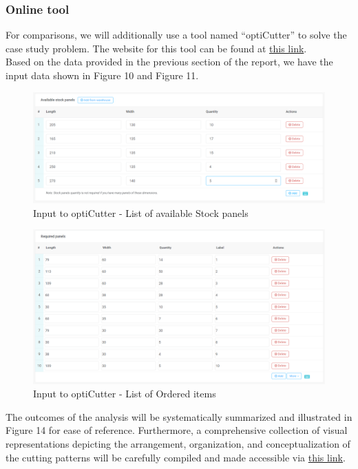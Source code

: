 \documentclass[a4paper]{article}
\begin{document}
    \subsubsection{Online tool}
    For comparisons, we will additionally use a tool named ``optiCutter'' to solve the case study problem. The website for this tool can be found at \href{https://www.opticutter.com/}{this link}.
    \vspace{0.2cm}\\
    Based on the data provided in the previous section of the report, we have the input data shown in Figure 10 and Figure 11.

    \begin{figure}[h]
        \centering
        \includegraphics[scale = 0.35]{Image/stock.png}
        \caption{Input to optiCutter - List of available Stock panels}
    \end{figure}    

    \begin{figure}[h]
        \centering
        \includegraphics[scale = 0.35]{Image/item.png}
        \caption{Input to optiCutter - List of Ordered items}
    \end{figure}
    
    \pagebreak
    \noindent
    The outcomes of the analysis will be systematically summarized and illustrated in Figure 14 for ease of reference. Furthermore, a comprehensive collection of visual representations depicting the arrangement, organization, and conceptualization of the cutting patterns will be carefully compiled and made accessible via \href{https://drive.google.com/drive/folders/1_dRKWVKkN0s9JnjSz-RYTw6IpdhNV-eQ?usp=sharing}{this link}.
\end{document}
